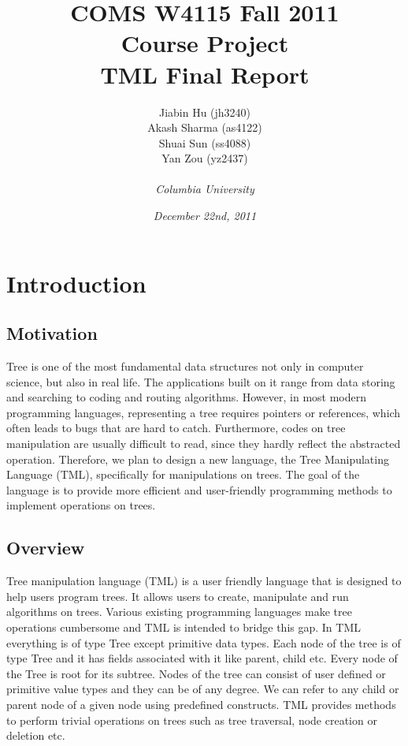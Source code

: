 \documentclass[12pt,psfig,a4]{article}
\begin{document}
 
\pagestyle{plain} 
\newenvironment{code}
{\sffamily
 \setlength{\parskip}{0pt}
}
{}

\title{\vspace{2in}\textbf{
COMS W4115 Fall 2011\\
Course Project\\
TML Final Report}}
\author{
Jiabin Hu (jh3240)\\
Akash Sharma (as4122)\\
Shuai Sun (ss4088)\\
Yan Zou (yz2437)\\\\
\textit{Columbia University}
}
\date{\textit{December 22nd, 2011}}
\maketitle

\pagebreak
\tableofcontents


\pagebreak
\section{Introduction}

\subsection{Motivation}
Tree is one of the most fundamental data structures not only in computer science, but also in real life. The applications built on it range from data storing and searching to coding and routing algorithms. However, in most modern programming languages, representing a tree requires pointers or references, which often leads to bugs that are hard to catch. Furthermore, codes on tree manipulation are usually difficult to read, since they hardly reflect the abstracted operation. Therefore, we plan to design a new language, the Tree Manipulating Language (TML), specifically for manipulations on trees. The goal of the language is to provide more efficient and user-friendly programming methods to implement operations on trees.

\subsection{Overview}
Tree manipulation language (TML) is a user friendly language that is designed to help users program trees. It allows users to create, manipulate and run algorithms on trees. Various existing programming languages make tree operations cumbersome and TML is intended to bridge this gap. In TML everything is of type Tree except primitive data types. Each node of the tree is of type Tree and it has fields associated with it like parent, child etc. Every node of the Tree is root for its subtree. Nodes of the tree can consist of user defined or primitive value types and they can be of any degree. We can refer to any child or parent node of a given node using predefined constructs. TML provides methods to perform trivial operations on trees such as tree traversal, node creation or deletion etc.
\end{document}

